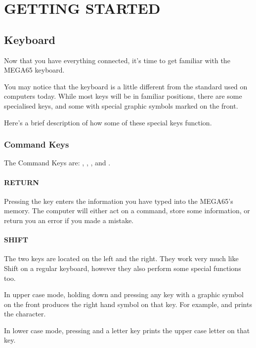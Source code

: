 \chapter{GETTING STARTED}
\section{Keyboard}
\label{cha:getting-started}

Now that you have everything connected, it's time to get familiar with the MEGA65 keyboard.

You may notice that the keyboard is a little different from the standard used on computers today. While most keys will be in familiar positions, there are some specialised keys, and some with special graphic symbols marked on the front.

Here's a brief description of how some of these special keys function.

\subsection{Command Keys}

The Command Keys are: , , , \megasymbolkey and .

\subsubsection{RETURN}

Pressing the  key enters the information you have typed into the MEGA65's memory. The computer will either act on a command, store some information, or return you an error if you made a mistake.

\subsubsection{SHIFT}

The two  keys are located on the left and the right. They work very much like Shift on a regular keyboard, however they also perform some special functions too.

In upper case mode, holding down  and pressing any key with a graphic symbol on the front produces the right hand symbol on that key. For example,  and  prints the character.

In lower case mode, pressing  and a letter key prints the upper case letter on that key.


